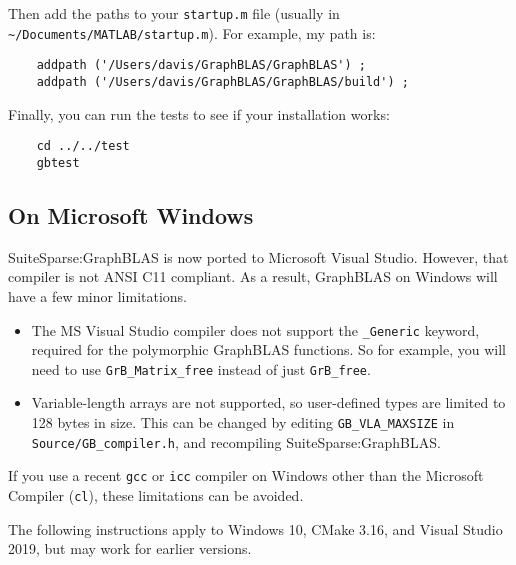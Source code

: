 \documentclass[12pt]{article}
\begin{document}
Then add the paths to your \verb'startup.m' file
(usually in \verb'~/Documents/MATLAB/startup.m').
For example, my path is:

    {\small
    \begin{verbatim}
    addpath ('/Users/davis/GraphBLAS/GraphBLAS') ;
    addpath ('/Users/davis/GraphBLAS/GraphBLAS/build') ; \end{verbatim} }

Finally, you can run the tests to see if your installation works:

    {\small
    \begin{verbatim}
    cd ../../test
    gbtest \end{verbatim} }

\subsection{On Microsoft Windows}
\label{sec:windows}

SuiteSparse:GraphBLAS is now ported to Microsoft Visual Studio.  However, that
compiler is not ANSI C11 compliant. As a result, GraphBLAS on Windows will have
a few minor limitations.

\begin{itemize}
\item The MS Visual Studio compiler does not support the \verb'_Generic'
keyword, required for the polymorphic GraphBLAS functions.  So for example, you
will need to use \verb'GrB_Matrix_free' instead of just \verb'GrB_free'.

\item Variable-length arrays are not supported, so user-defined
types are limited to 128 bytes in size.  This can be changed by editing
\verb'GB_VLA_MAXSIZE' in \verb'Source/GB_compiler.h', and recompiling
SuiteSparse:GraphBLAS.
\end{itemize}

If you use a recent \verb'gcc' or \verb'icc' compiler on Windows other than the
Microsoft Compiler (\verb'cl'), these limitations can be avoided.

The following instructions apply to Windows 10, CMake 3.16, and
Visual Studio 2019, but may work for earlier versions.
\end{document}

